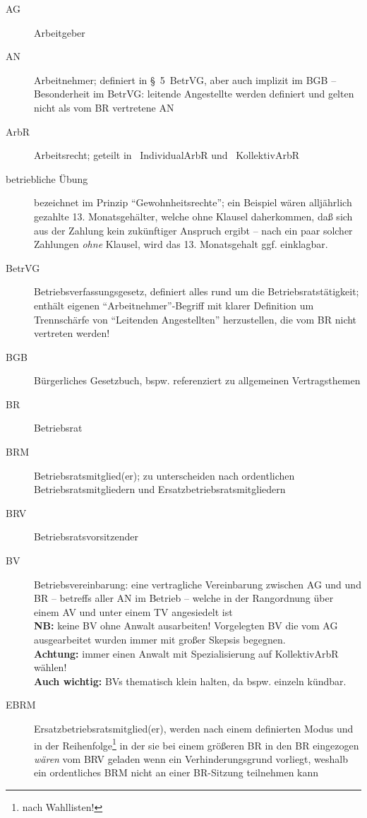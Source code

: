 \documentclass[version=last,paper=A4,fontsize=11pt,DIV=18]{scrartcl}
\begin{document}
\begin{description}
	\item[AG] Arbeitgeber
	\item[AN] Arbeitnehmer; definiert in \S~5~BetrVG, aber auch implizit im BGB -- Besonderheit im BetrVG: leitende Angestellte werden definiert und gelten nicht als vom BR vertretene AN
	\item[ArbR] Arbeitsrecht; geteilt in ~IndividualArbR und ~KollektivArbR
	\item[betriebliche Übung] bezeichnet im Prinzip \enquote{Gewohnheitsrechte}; ein Beispiel wären alljährlich gezahlte 13. Monatsgehälter, welche ohne Klausel daherkommen, daß sich aus der Zahlung kein zukünftiger Anspruch ergibt -- nach ein paar solcher Zahlungen \emph{ohne} Klausel, wird das 13. Monatsgehalt ggf. einklagbar.
	\item[BetrVG] Betriebsverfassungsgesetz, definiert alles rund um die Betriebsratstätigkeit; enthält eigenen \enquote{Arbeitnehmer}-Begriff mit klarer Definition um Trennschärfe von \enquote{Leitenden Angestellten} herzustellen, die vom BR nicht vertreten werden!
	\item[BGB] Bürgerliches Gesetzbuch, bspw. referenziert zu allgemeinen Vertragsthemen
	\item[BR] Betriebsrat
	\item[BRM] Betriebsratsmitglied(er); zu unterscheiden nach ordentlichen Betriebsratsmitgliedern und Ersatzbetriebsratsmitgliedern
	\item[BRV] Betriebsratsvorsitzender
	\item[BV] Betriebsvereinbarung: eine vertragliche Vereinbarung zwischen AG und und BR -- betreffs aller AN im Betrieb -- welche in der Rangordnung über einem AV und unter einem TV angesiedelt ist\\
	\textbf{NB:} keine BV ohne Anwalt ausarbeiten! Vorgelegten BV die vom AG ausgearbeitet wurden immer mit großer Skepsis begegnen.\\
	\textbf{Achtung:} immer einen Anwalt mit Spezialisierung auf KollektivArbR wählen!\\
	\textbf{Auch wichtig:} BVs thematisch klein halten, da bspw. einzeln kündbar.
	\item[EBRM] Ersatzbetriebsratsmitglied(er), werden nach einem definierten Modus und in der Reihenfolge\footnote{nach Wahllisten!} in der sie bei einem größeren BR in den BR eingezogen \emph{wären} vom BRV geladen wenn ein Verhinderungsgrund vorliegt, weshalb ein ordentliches BRM nicht an einer BR-Sitzung teilnehmen kann\\

\end{description}
\end{document}
